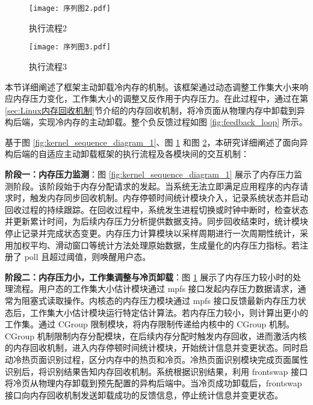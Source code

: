 \begin{figure}[h]
\centering
\texttt{[image: 序列图2.pdf]}
\caption{执行流程2}
\label{fig:kernel_sequence_diagram_2}
\end{figure}

\begin{figure}[h]
\centering
\texttt{[image: 序列图3.pdf]}
\caption{执行流程3}
\label{fig:kernel_sequence_diagram_3}
\end{figure}

本节详细阐述了框架主动卸载冷内存的机制。该框架通过动态调整工作集大小来响应内存压力变化，工作集大小的调整又反作用于内存压力。在此过程中，通过在第\ref{sec:Linux内存回收机制}节介绍的内存回收机制，将冷页面从物理内存中卸载到异构后端，实现冷内存的主动卸载。整个负反馈过程如图 \ref{fig:feedback_loop} 所示。

基于图 \ref{fig:kernel_sequence_diagram_1}、图 \ref{fig:kernel_sequence_diagram_2} 和图 \ref{fig:kernel_sequence_diagram_3}，本研究详细阐述了面向异构后端的自适应主动卸载框架的执行流程及各模块间的交互机制：

\textbf{阶段一：内存压力监测}：图 \ref{fig:kernel_sequence_diagram_1} 展示了内存压力监测阶段。该阶段始于内存分配请求的发起。当系统无法立即满足应用程序的内存请求时，触发内存同步回收机制。内存停顿时间统计模块介入，记录系统状态并启动回收过程的持续跟踪。在回收过程中，系统发生进程切换或时钟中断时，检查状态并更新累计时间，为后续内存压力分析提供数据支持。同步回收结束时，统计模块停止记录并完成状态变更。内存压力计算模块以采样周期进行一次周期性统计，采用加权平均、滑动窗口等统计方法处理原始数据，生成量化的内存压力指标。若注册了 poll 且超过阈值，则唤醒用户态。

\textbf{阶段二：内存压力小，工作集调整与冷页卸载}：图 \ref{fig:kernel_sequence_diagram_2} 展示了内存压力较小时的处理流程。用户态的工作集大小估计模块通过 mpfs 接口发起内存压力数据请求，通常为阻塞式读取操作。内核态的内存压力模块通过 mpfs 接口反馈最新内存压力状态后，工作集大小估计模块运行特定估计算法。若内存压力较小，则计算出更小的工作集。通过  CGroup  限制模块，将内存限制传递给内核中的  CGroup  机制。 CGroup  机制限制内存分配模块，在后续内存分配时触发内存回收，进而激活内核的内存回收机制，进入内存停顿时间统计模块，开始统计信息并变更状态。同时启动冷热页面识别过程，区分内存中的热页和冷页。冷热页面识别模块完成页面属性识别后，将识别结果告知内存回收机制。系统根据识别结果，利用 frontswap 接口将冷页从物理内存卸载到预先配置的异构后端中。当冷页成功卸载后，frontswap 接口向内存回收机制发送卸载成功的反馈信息，停止统计信息并变更状态。

